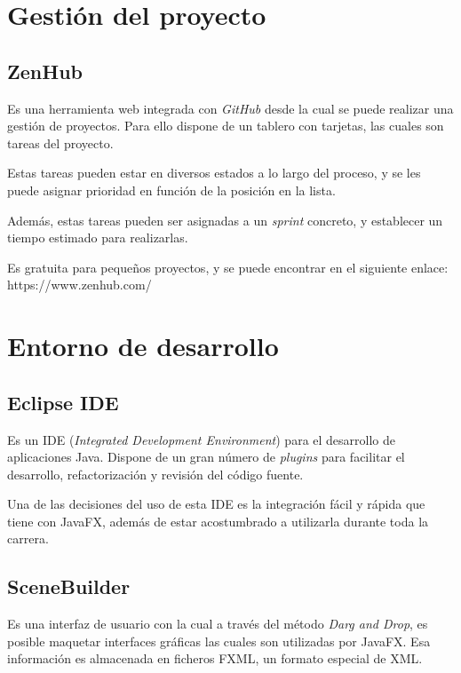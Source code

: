 \section{Gestión del proyecto}\label{gestion_del_proyecto}

\subsection{ZenHub}\label{zenhub}

Es una herramienta web integrada con \emph{GitHub} desde la cual se puede realizar una gestión de proyectos. Para ello dispone de un tablero con tarjetas, las cuales son tareas del proyecto.

Estas tareas pueden estar en diversos estados a lo largo del proceso, y se les puede asignar prioridad en función de la posición en la lista.

Además, estas tareas pueden ser asignadas a un \emph{sprint} concreto, y establecer un tiempo estimado para realizarlas.

Es gratuita para pequeños proyectos, y se puede encontrar en el siguiente enlace: https://www.zenhub.com/

\section{Entorno de desarrollo}\label{entorno_de_desarrollo}

\subsection{Eclipse IDE}\label{eclipse_ide}

Es un IDE (\emph{Integrated Development Environment}) para el desarrollo de aplicaciones Java. Dispone de un gran número de \emph{plugins} para facilitar el desarrollo, refactorización y revisión del código fuente.

Una de las decisiones del uso de esta IDE es la integración fácil y rápida que tiene con JavaFX, además de estar acostumbrado a utilizarla durante toda la carrera.

\subsection{SceneBuilder}\label{scenebuilder}

Es una interfaz de usuario con la cual a través del método \emph{Darg and Drop}, es posible maquetar interfaces gráficas las cuales son utilizadas por JavaFX. Esa información es almacenada en ficheros FXML, un formato especial de XML.

